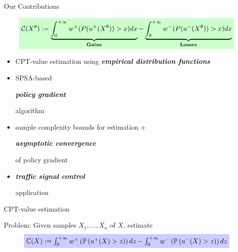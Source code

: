 \documentclass{beamer}
\begin{document}
\begin{frame}{Our Contributions}
\begin{small}
\begin{scriptsize}
\begin{align*}
\tikz[baseline]{
            \node[fill=green!20,anchor=base] (t1)
            {${\cal C} (X^\theta):= \underbrace{\intinfinity w^+(P(u^+(X^\theta))>x) dx}_{\textbf{Gains}} - \underbrace{\intinfinity w^-(P(u^-(X^\theta))>x) dx}_{\textbf{Losses}}$};
        }
\end{align*}
  \begin{center}
\end{center}
\end{scriptsize}

\begin{itemize}
	\item CPT-value estimation using \alert{\footnotesize\bf\em empirical distribution functions}
	\item SPSA-based \begin{footnotesize}\alert{\bf\em policy gradient}\end{footnotesize}  algorithm
	\item sample complexity bounds for estimation + \begin{footnotesize}\alert{\bf\em asymptotic convergence}\end{footnotesize} of policy gradient
	\item \begin{footnotesize}\alert{\bf\em traffic signal control}\end{footnotesize} application
\end{itemize}
\end{small}

\end{frame}

\begin{frame}{CPT-value estimation}
\begin{small}

{\color{red} Problem:} Given samples $X_1, \ldots, X_n$ of $X$, estimate
%
\begin{align*}
\tikz[baseline]{
            \node[fill=blue!20,anchor=base] (t1)
            {$\C(X):= \intinfinity w^+\left(\Prob{u^+(X)>z}\right) dz - \intinfinity w^-\left(\Prob{u^-(X)>z}\right) dz$};
        }
\end{align*}

\vspace{0.25in}

				
\end{small}				
\end{frame}
\end{document}
